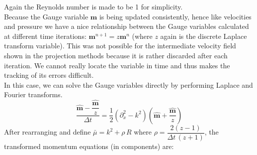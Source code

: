 Again the Reynolds number is made to be 1 for simplicity.\\
Because the Gauge variable $\textbf{m}$ is being updated consistently, hence like velocities and pressure we have a nice relationship between the Gauge variables calculated at different time iterations: $\textbf{m}^{n+1} = z \textbf{m}^n$ (where $z$ again is the discrete Laplace transform variable). This was not possible for the intermediate velocity field shown in the projection methods because it is rather discarded after each iteration. We cannot really locate the variable in time and thus makes the tracking of its errors difficult.\\

In this case, we can solve the Gauge variables directly by performing Laplace and Fourier transforms.\\
\begin{equation*}
\dfrac{\hat{\textbf{m}} - \dfrac{\hat{\textbf{m}}}{z}}{\Delta t} = \dfrac{1}{2}\left(\partial_x^2 - k^2 \right)
\left(\hat{\textbf{m}} + \dfrac{\hat{\textbf{m}}}{z} \right)
\end{equation*}
After rearranging and define $\bar{\mu} = k^2 + \rho\,R$ where $\rho = \dfrac{2(z-1)}{\Delta t \,(z+1)}$, the transformed momentum equations (in components) are:

